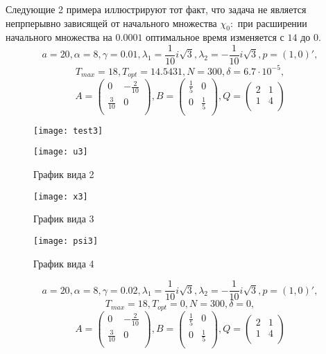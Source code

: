 \documentclass[11pt]{article}
\begin{document}
\newpage
Следующие 2 примера иллюстрируют тот факт, что задача не является непрперывно зависящей от начального множества $\chi_0:$
при расширении начального множества на $0.0001$ оптимальное время изменяется с $14$ до $0.$
\[a = 20, \alpha = 8, \gamma = 0.01, \lambda_1 = \frac{1}{10}i\sqrt{3}, \lambda_2 = -\frac{1}{10}i\sqrt{3}, p = (1,0)',\] 
\[T_{max} = 18, T_{opt} = 14.5431, N = 300, \delta = 6.7\cdot 10^{-5},\]
\[
A = \left(
\begin{array}{cc}
0 & -\frac{2}{10}\\
\frac{3}{10} & 0\\
\end{array}
\right),
B = \left(
\begin{array}{cc}
\frac{1}{5} & 0\\
0 & \frac{1}{5}\\
\end{array}
\right),
Q = \left(
\begin{array}{cc}
2 & 1\\
1 & 4\\
\end{array}
\right)
\]

\begin{figure}[h!]
%
{\texttt{[image: test3]}}
\end{figure}

\begin{figure}\caption{График вида 2}
\centering
\texttt{[image: u3]}
\end{figure}

\begin{figure}\caption{График вида 3}
\centering
\texttt{[image: x3]}
\end{figure}

\begin{figure}\caption{График вида 4}
\centering
\texttt{[image: psi3]}
\end{figure}
\newpage

\newpage
\[a = 20, \alpha = 8, \gamma = 0.02, \lambda_1 = \frac{1}{10}i\sqrt{3}, \lambda_2 = -\frac{1}{10}i\sqrt{3}, p = (1,0)',\] 
\[T_{max} = 18, T_{opt} = 0, N = 300, \delta = 0,\]
\[
A = \left(
\begin{array}{cc}
0 & -\frac{2}{10}\\
\frac{3}{10} & 0\\
\end{array}
\right),
B = \left(
\begin{array}{cc}
\frac{1}{5} & 0\\
0 & \frac{1}{5}\\
\end{array}
\right),
Q = \left(
\begin{array}{cc}
2 & 1\\
1 & 4\\
\end{array}
\right)
\]
\end{document}

